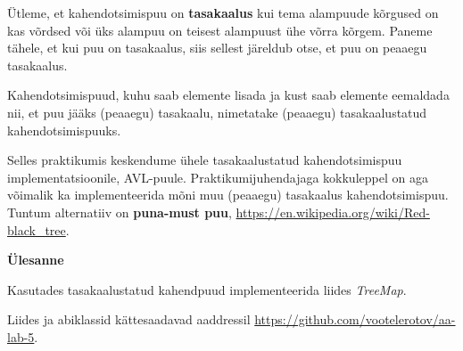\documentclass[a4paper]{article}
\begin{document}
Ütleme, et kahendotsimispuu on \textbf{tasakaalus} kui tema alampuude kõrgused on kas võrdsed või üks alampuu on teisest alampuust ühe võrra kõrgem. Paneme tähele, et kui puu on tasakaalus, siis sellest järeldub otse, et puu on peaaegu tasakaalus.

Kahendotsimispuud, kuhu saab elemente lisada ja kust saab elemente eemaldada nii, et puu jääks (peaaegu) tasakaalu, nimetatake (peaaegu) tasakaalustatud kahendotsimispuuks. 

Selles praktikumis keskendume ühele tasakaalustatud kahendotsimispuu implementatsioonile, AVL-puule. Praktikumijuhendajaga kokkuleppel on aga võimalik ka implementeerida mõni muu (peaaegu) tasakaalus kahendotsimispuu. Tuntum alternatiiv on \textbf{puna-must puu}, \url{https://en.wikipedia.org/wiki/Red-black_tree}.



\begin{problem}
\textbf{Ülesanne}

Kasutades tasakaalustatud kahendpuud implementeerida liides \textit{TreeMap}.
\end{problem}


Liides ja abiklassid kättesaadavad aaddressil \url{https://github.com/vootelerotov/aa-lab-5}.
\end{document}
